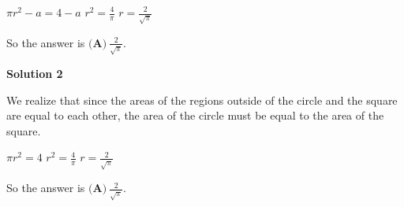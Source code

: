 \begin{enumerate}
 $\pi r^2 -a=4-a$
$r^2=\frac{4}{\pi}$
$r=\frac{2}{\sqrt{\pi}}$

 So the answer is $\boxed{\textbf{(A)}\ \frac{2}{\sqrt{\pi}}}$.

 



\textbf{Solution 2}

We realize that since the areas of the regions outside of the circle and the square are equal to each other, the area of the circle must be equal to the area of the square.

 $\pi r^2=4$
$r^2=\frac{4}{\pi}$
$r=\frac{2}{\sqrt{\pi}}$

 So the answer is $\boxed{\textbf{(A)}\ \frac{2}{\sqrt{\pi}}}$.

 


\end{enumerate}